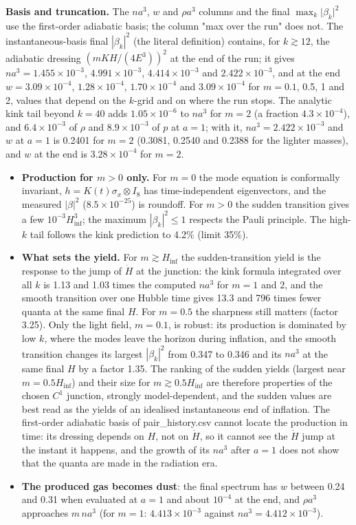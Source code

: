 \documentclass[11pt]{article}
\begin{document}
\textbf{Basis and truncation.} The $na^3$, $w$ and $\rho a^3$ columns and the final $\max_k\lvert\beta_k\rvert^2$ use the first-order adiabatic basis; the column "max over the run" does not. The instantaneous-basis final $|\beta_k|^2$ (the literal definition) contains, for $k\gtrsim12$, the adiabatic dressing $(mKH/(4E^3))^2$ at the end of the run; it gives $na^3=1.455\times10^{-3}$, $4.991\times10^{-3}$, $4.414\times10^{-3}$ and $2.422\times10^{-3}$, and at the end $w=3.09\times10^{-4}$, $1.28\times10^{-4}$, $1.70\times10^{-4}$ and $3.09\times10^{-4}$ for $m=0.1$, 0.5, 1 and 2, values that depend on the $k$-grid and on where the run stops. The analytic kink tail beyond $k=40$ adds $1.05\times10^{-6}$ to $na^3$ for $m=2$ (a fraction $4.3\times10^{-4}$), and $6.4\times10^{-3}$ of $\rho$ and $8.9\times10^{-3}$ of $p$ at $a=1$; with it, $na^3=2.422\times10^{-3}$ and $w$ at $a=1$ is 0.2401 for $m=2$ (0.3081, 0.2540 and 0.2388 for the lighter masses), and $w$ at the end is $3.28\times10^{-4}$ for $m=2$.

\begin{itemize}
\item \textbf{Production for $m>0$ only.} For $m=0$ the mode equation is conformally invariant, $h=K(t)\sigma_x\otimes I_8$ has time-independent eigenvectors, and the measured $|\beta|^2$ ($8.5\times10^{-25}$) is roundoff. For $m>0$ the sudden transition gives a few $10^{-3}H_{\mathrm{inf}}^3$; the maximum $|\beta_k|^2\le1$ respects the Pauli principle. The high-$k$ tail follows the kink prediction to 4.2\% (limit 35\%).
\item \textbf{What sets the yield.} For $m\gtrsim H_{\mathrm{inf}}$ the sudden-transition yield is the response to the jump of $\dot H$ at the junction: the kink formula integrated over all $k$ is 1.13 and 1.03 times the computed $na^3$ for $m=1$ and 2, and the smooth transition over one Hubble time gives 13.3 and 796 times fewer quanta at the same final $H$. For $m=0.5$ the sharpness still matters (factor 3.25). Only the light field, $m=0.1$, is robust: its production is dominated by low $k$, where the modes leave the horizon during inflation, and the smooth transition changes its largest $|\beta_k|^2$ from 0.347 to 0.346 and its $na^3$ at the same final $H$ by a factor 1.35. The ranking of the sudden yields (largest near $m=0.5H_{\mathrm{inf}}$) and their size for $m\gtrsim0.5H_{\mathrm{inf}}$ are therefore properties of the chosen $C^1$ junction, strongly model-dependent, and the sudden values are best read as the yields of an idealised instantaneous end of inflation. The first-order adiabatic basis of pair\_history.csv cannot locate the production in time: its dressing depends on $H$, not on $\dot H$, so it cannot see the $\dot H$ jump at the instant it happens, and the growth of its $na^3$ after $a=1$ does not show that the quanta are made in the radiation era.
\item \textbf{The produced gas becomes dust}: the final spectrum has $w$ between 0.24 and 0.31 when evaluated at $a=1$ and about $10^{-4}$ at the end, and $\rho a^3$ approaches $m\,na^3$ (for $m=1$: $4.413\times10^{-3}$ against $na^3=4.412\times10^{-3}$).
\end{itemize}
\end{document}
